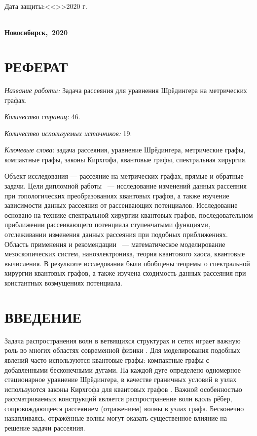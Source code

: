 \documentclass[a4 paper, 12 pt]{extarticle}
\begin{document}
	\hfill \break
	\begin{flushright}
		\large{Дата защиты:\large{<<\makebox[1cm]{\hrulefill}>>\makebox[4cm]{\hrulefill}2020 г.}}
	\end{flushright}
	
	\hfill \break
	\begin{singlespacing}
		\begin{center}
			\large{\textbf{\\Новосибирск,~2020}}
		\end{center} 
	\end{singlespacing}

	\section*{РЕФЕРАТ}
	{\it Название работы:} Задача рассеяния для уравнения Шрёдингера на метрических графах.
	
	{\it Количество страниц:} 46.
	
	{\it Количество используемых источников:} 19.
	
	{\it Ключевые слова}: задача рассеяния, уравнение Шрёдингера, метрические графы, компактные графы, законы Кирхгофа, квантовые графы, спектральная хирургия.
	
	Объект исследования --- рассеяние на метрических графах, прямые и обратные задачи. Цели дипломной работы ~--- исследование изменений данных рассеяния при топологических преобразованиях квантовых графов, а также изучение зависимости данных рассеяния от рассеивающих потенциалов. 	Исследование основано на технике спектральной хирургии квантовых графов, последовательном приближении рассеивающего потенциала ступенчатыми функциями, отслеживании изменения данных рассеяния при подобных приближениях. Область применения и рекомендации ~--- математическое моделирование мезоскопических систем, наноэлектроника, теория квантового хаоса, квантовые вычисления. В результате исследования были обобщены теоремы о спектральной хирургии квантовых графов, а также изучена сходимость данных рассеяния при константных возмущениях потенциала.
	
	\newpage
	\tableofcontents
	\newpage
	\section*{ВВЕДЕНИЕ}
	Задача распространения волн в ветвящихся структурах и сетях играет важную роль во многих областях современной физики \cite{TransparentQuantumGraphs}. Для моделирования подобных явлений часто используются квантовые графы: компактные графы с добавленными бесконечными дугами. На каждой дуге определено одномерное стационарное уравнение Шрёдингера, в качестве граничных условий в узлах используются законы Кирхгофа для квантовых графов \cite{KirchhoffRule}. Важной особенностью рассматриваемых конструкций является распространение волн вдоль рёбер, сопровождающееся рассеянием (отражением)  волны в узлах графа. Бесконечно накапливаясь, отражённые волны могут оказать существенное влияние на решение задачи рассеяния.
	
\end{document}
